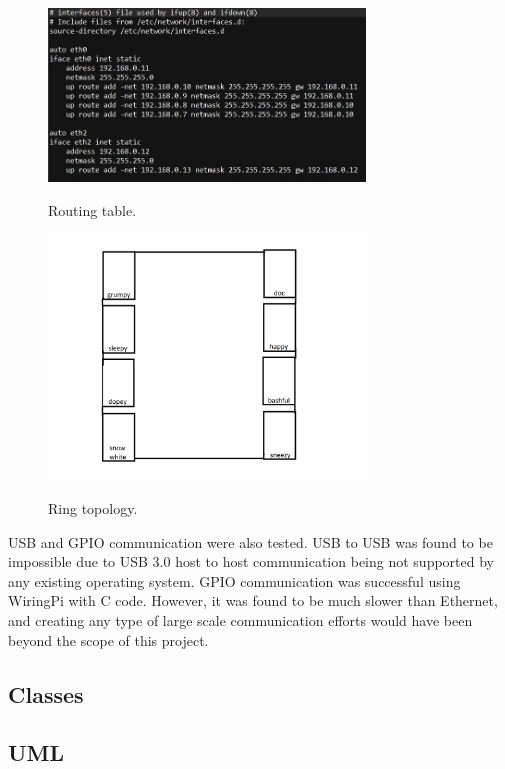  \begin{figure}[tbh]
	\caption{Routing table.}
	\centering
		\includegraphics[width=0.75\textwidth]{routingtable.JPG}
	\label{fig:routing}
\end{figure}

 \begin{figure}[tbh]
	\caption{Ring topology.}
	\centering
		\includegraphics[width=0.75\textwidth]{ring.png}
	\label{fig:ring}
\end{figure}

	USB and GPIO communication were also tested. USB to USB was found to be impossible due to USB 3.0 host to host communication being not supported by any existing operating system. GPIO communication was successful using WiringPi with C code. However, it was found to be much slower than Ethernet, and creating any type of large scale communication efforts would have been beyond the scope of this project.
 
 \subsection{Classes}
 
 \subsection{UML}


